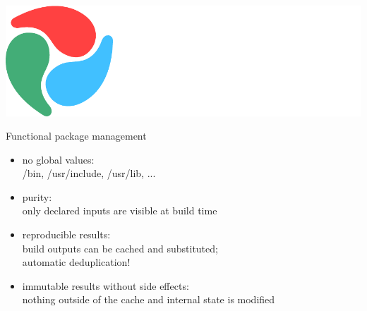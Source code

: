 \documentclass{beamer}
\begin{document}
\begin{frame}[plain]
  \includegraphics[width=\textwidth]{images/guix-logo}
\end{frame}

\begin{frame}{Functional package management}
  \Large{
  \begin{itemize}
  \item no \alert{global} values:\\
        /bin, /usr/include, /usr/lib, ...
  \item \alert{purity}:\\
        only declared inputs are visible at build time
  \item \alert{reproducible} results:\\
        build outputs can be cached and substituted;\\
        automatic deduplication!
  \item \alert{immutable results} without \alert{side effects}:\\
        nothing outside of the cache and internal state is modified
  \end{itemize}
  }
\end{frame}
\end{document}

